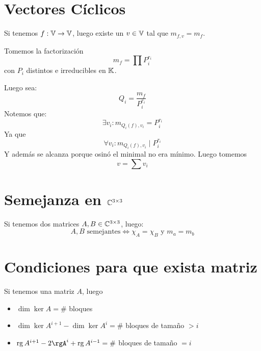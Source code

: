 \documentclass{article}
\begin{document}
\section*{Vectores Cíclicos}
Si tenemos $f : \mathbb{V} \to \mathbb{V}$, luego existe un $v \in \mathbb{V}$ tal que $m_{f,v} = m_f$.

Tomemos la factorización
\[m_f = \prod P_i^{r_i}\]
con $P_i$ distintos e irreducibles en $\mathbb{K}$.

Luego sea:
\[Q_i = \frac{m_f}{P_i^{r_i}}\]
Notemos que:
\[
	\exists v_i : m_{Q_i(f), v_i} = P_i^{r_i}
\]
Ya que
\[
	\forall v_i : m_{Q_i(f), v_i} \mid P_i^{r_i}
\]
Y además se alcanza porque osinó el minimal no era mínimo.
Luego tomemos
\[v = \sum v_i\]

\section*{Semejanza en $\mathbb{C}^{3 \times 3}$}
Si tenemos dos matrices $A, B \in \mathbb{C}^{3 \times 3}$, luego:
\[
	A,B \text{ semejantes} \iff \chi_A = \chi_B \text{ y } m_a = m_b
\]

\section*{Condiciones para que exista matriz}
Si tenemos una matriz $A$, luego
\begin{itemize}
	\item $\dim \ker A = \#$ bloques
	\item $\dim \ker A^{i+1} - \dim \ker A^i = \#$ bloques de tamaño $> i$
	\item $\rg A^{i+1} - 2\rgA^i + \rg A^{i-1} = \#$ bloques de tamaño $= i$
\end{itemize}
\end{document}
